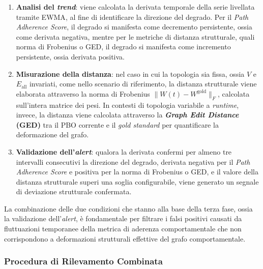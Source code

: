 \begin{enumerate}
  \item \textbf{Analisi del \textit{trend}}: viene calcolata la derivata temporale della serie
        livellata tramite \gls{EWMA}, al fine di identificare la direzione del degrado. Per il
        \textit{Path Adherence Score}, il degrado si manifesta come decremento persistente, ossia
        come derivata negativa, mentre per le metriche di distanza strutturale, quali norma di
        Frobenius o \gls{GED}, il degrado si manifesta come incremento persistente, ossia derivata
        positiva.
  \item \textbf{Misurazione della distanza}: nel caso in cui la topologia sia fissa, ossia $V$ e
        $E_{\text{all}}$ invariati, come nello scenario di riferimento, la distanza strutturale
        viene elaborata attraverso la norma di Frobenius $\|W(t) - W^{\text{gold}}\|_F$, calcolata
        sull'intera matrice dei pesi. In contesti di topologia variabile a \textit{runtime},
        invece, la distanza viene calcolata attraverso la \textbf{\textit{Graph Edit Distance}
        (\gls{GED})} tra il \gls{PBO} corrente e il \textit{gold standard} per quantificare la
        deformazione del grafo.
  \item \textbf{Validazione dell'\textit{alert}}: qualora la derivata confermi per almeno tre
        intervalli consecutivi la direzione del degrado, derivata negativa per il \textit{Path
        Adherence Score} e positiva per la norma di Frobenius o \gls{GED}, e il valore della
        distanza strutturale superi una soglia configurabile, viene generato un segnale di
        deviazione strutturale confermata.
\end{enumerate}

La combinazione delle due condizioni che stanno alla base della terza fase, ossia la validazione
dell'\textit{alert}, è fondamentale per filtrare i falsi positivi causati da fluttuazioni temporanee
della metrica di aderenza comportamentale che non corrispondono a deformazioni strutturali effettive
del grafo comportamentale.

\subsubsection{Procedura di Rilevamento Combinata}
\label{sec:rilevamento_combinato}


